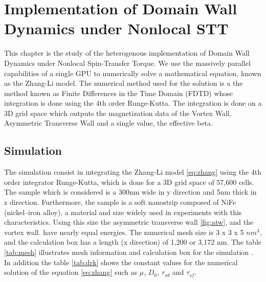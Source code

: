 
\chapter{Implementation of Domain Wall Dynamics under Nonlocal STT} %

\label{Implementation of Domain Wall Dynamics under Nonlocal STT} %


This chapter is the study of the heterogenous implementation of Domain Wall Dynamics under Nonlocal Spin-Transfer Torque. We use the massively parallel capabilities of a single GPU to numerically solve a mathematical equation, known as the Zhang-Li model. The numerical method used for the solution is a the method known as Finite Differences in the Time Domain (FDTD) whose integration is done using the 4th order Runge-Kutta. The integration is done on a 3D grid space which outputs the magnetization data of the Vortex Wall, Asymmetric Transverse Wall and a single value, the effective beta.

\section{Simulation}

The simulation consist in integrating the Zhang-Li model \ref{eq:zhang} using the 4th order integrator Runge-Kutta, which is done for a 3D grid space of 57,600 cells. The sample which is considered is a 300nm wide in y direction and 5nm thick in z direction. Furthermore, the sample is a soft nanostrip composed of NiFe (nickel–iron alloy), a material and size widely used in experiments with this characteristics. Using this size the asymmetric transverse wall \ref{fig:atw}, and the vortex wall. have nearly equal energies. The numerical mesh size is 3 x 3 x 5 $nm^3$, and the calculation box has a length (x direction) of 1,200 or 3,172 nm. The table \ref{tab:mesh} illustrates mesh information and calculation box for the simulation \cite{claudio}. In addition the table \ref{tab:drk} shows the constant values for the numerical solution of the equation \ref{eq:zhang} such as $\mu$, $D_{0}$, $\tau_{sd}$ and $\tau_{sf}$.

